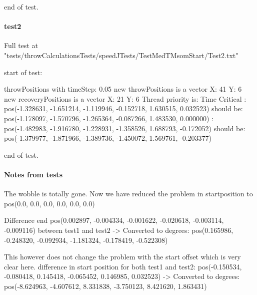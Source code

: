 end of test.\newline 

\paragraph{test2}
Full test at "tests/throwCalculationsTests/speedJTests/TestMedTMsomStart/Test2.txt"\newline

start of test:\newline

throwPositions with timeStep:  0.05
\newline new throwPositions is a vector X: 41 Y:  6
\newline new recoveryPositions is a vector X: 21 Y:  6
\newline Thread priority is: Time Critical
\newline [0.000000s - Step 0/41]:
\newline \hspace{1cm}        pos(-1.328631, -1.651214, -1.119946, -0.152718, 1.630515, 0.032523) should be:
\newline \hspace{1cm}        pos(-1.178097, -1.570796, -1.265364, -0.087266, 1.483530, 0.000000)
\newline [2.000000s - Step 40/41]:
\newline \hspace{1cm}        pos(-1.482983, -1.916780, -1.228931, -1.358526, 1.688793, -0.172052) should be:
\newline \hspace{1cm}        pos(-1.379977, -1.871966, -1.389736, -1.450072, 1.569761, -0.203377)

end of test.\newline 

\paragraph{Notes from tests}
The wobble is totally gone. Now we have reduced the problem in startposition to pos(0.0, 0.0, 0.0, 0.0, 0.0, 0.0)\newline 

Difference end pos(0.002897, -0.004334, -0.001622, -0.020618, -0.003114, -0.009116) between test1 and test2 -> Converted to degrees: pos(0.165986, -0.248320, -0.092934, -1.181324, -0.178419, -0.522308)\newline 

This however does not change the problem with the start offset which is very clear here.
\newline difference in start position for both test1 and test2: pos(-0.150534, -0.080418, 0.145418, -0.065452, 0.146985, 0.032523) -> Converted to degrees: pos(-8.624963, -4.607612, 8.331838, -3.750123, 8.421620, 1.863431)\newline 

